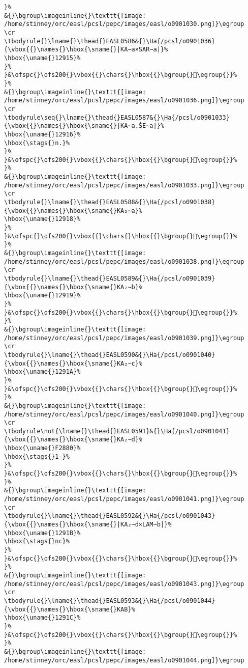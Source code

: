\begin{verbatim}
}%
&{}\bgroup\imageinline{}\texttt{[image: /home/stinney/orc/easl/pcsl/pepc/images/easl/o0901030.png]}\egroup
\cr
\tbodyrule{}\lname{}\thead{}EASL0586&{}\Ha{/pcsl/o0901036}{\vbox{{}\names{}\hbox{\sname{}|KA∼a×SAR∼a|}%
\hbox{\uname{}12915}%
}%
}&\ofspc{}\ofs200{}\vbox{{}\chars{}\hbox{{}\bgroup{}𒤕\egroup{}}%
}%
&{}\bgroup\imageinline{}\texttt{[image: /home/stinney/orc/easl/pcsl/pepc/images/easl/o0901036.png]}\egroup
\cr
\tbodyrule\seq{}\lname{}\thead{}EASL0587&{}\Ha{/pcsl/o0901033}{\vbox{{}\names{}\hbox{\sname{}|KA∼a.ŠE∼a|}%
\hbox{\uname{}12916}%
\hbox{\stags{}n.}%
}%
}&\ofspc{}\ofs200{}\vbox{{}\chars{}\hbox{{}\bgroup{}𒤖\egroup{}}%
}%
&{}\bgroup\imageinline{}\texttt{[image: /home/stinney/orc/easl/pcsl/pepc/images/easl/o0901033.png]}\egroup
\cr
\tbodyrule{}\lname{}\thead{}EASL0588&{}\Ha{/pcsl/o0901038}{\vbox{{}\names{}\hbox{\sname{}KA₂∼a}%
\hbox{\uname{}12918}%
}%
}&\ofspc{}\ofs200{}\vbox{{}\chars{}\hbox{{}\bgroup{}𒤘\egroup{}}%
}%
&{}\bgroup\imageinline{}\texttt{[image: /home/stinney/orc/easl/pcsl/pepc/images/easl/o0901038.png]}\egroup
\cr
\tbodyrule{}\lname{}\thead{}EASL0589&{}\Ha{/pcsl/o0901039}{\vbox{{}\names{}\hbox{\sname{}KA₂∼b}%
\hbox{\uname{}12919}%
}%
}&\ofspc{}\ofs200{}\vbox{{}\chars{}\hbox{{}\bgroup{}𒤙\egroup{}}%
}%
&{}\bgroup\imageinline{}\texttt{[image: /home/stinney/orc/easl/pcsl/pepc/images/easl/o0901039.png]}\egroup
\cr
\tbodyrule{}\lname{}\thead{}EASL0590&{}\Ha{/pcsl/o0901040}{\vbox{{}\names{}\hbox{\sname{}KA₂∼c}%
\hbox{\uname{}1291A}%
}%
}&\ofspc{}\ofs200{}\vbox{{}\chars{}\hbox{{}\bgroup{}𒤚\egroup{}}%
}%
&{}\bgroup\imageinline{}\texttt{[image: /home/stinney/orc/easl/pcsl/pepc/images/easl/o0901040.png]}\egroup
\cr
\tbodyrule\not{\lname{}\thead{}EASL0591}&{}\Ha{/pcsl/o0901041}{\vbox{{}\names{}\hbox{\sname{}KA₂∼d}%
\hbox{\uname{}F2880}%
\hbox{\stags{}1-}%
}%
}&\ofspc{}\ofs200{}\vbox{{}\chars{}\hbox{{}\bgroup{}󲢀\egroup{}}%
}%
&{}\bgroup\imageinline{}\texttt{[image: /home/stinney/orc/easl/pcsl/pepc/images/easl/o0901041.png]}\egroup
\cr
\tbodyrule{}\lname{}\thead{}EASL0592&{}\Ha{/pcsl/o0901043}{\vbox{{}\names{}\hbox{\sname{}|KA₂∼d×LAM∼b|}%
\hbox{\uname{}1291B}%
\hbox{\stags{}nc}%
}%
}&\ofspc{}\ofs200{}\vbox{{}\chars{}\hbox{{}\bgroup{}𒤛\egroup{}}%
}%
&{}\bgroup\imageinline{}\texttt{[image: /home/stinney/orc/easl/pcsl/pepc/images/easl/o0901043.png]}\egroup
\cr
\tbodyrule{}\lname{}\thead{}EASL0593&{}\Ha{/pcsl/o0901044}{\vbox{{}\names{}\hbox{\sname{}KAB}%
\hbox{\uname{}1291C}%
}%
}&\ofspc{}\ofs200{}\vbox{{}\chars{}\hbox{{}\bgroup{}𒤜\egroup{}}%
}%
&{}\bgroup\imageinline{}\texttt{[image: /home/stinney/orc/easl/pcsl/pepc/images/easl/o0901044.png]}\egroup

\end{verbatim}
